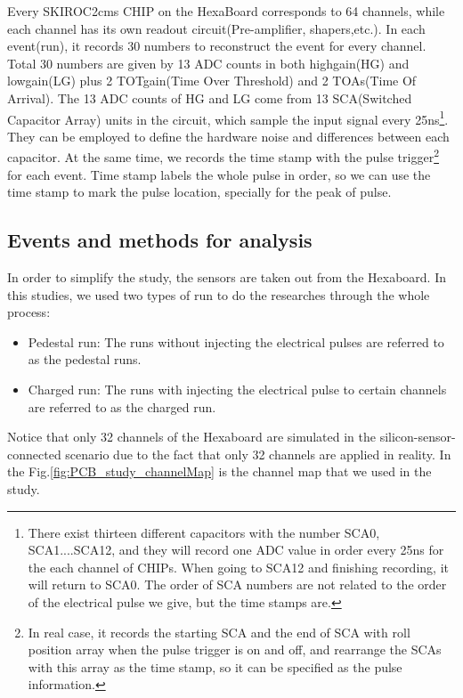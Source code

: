 \documentclass[12pt,twoside,a4paper,an,final]{cms-tdr}
\begin{document}
Every SKIROC2cms CHIP on the HexaBoard corresponds to 64 channels, while each channel has its own readout circuit(Pre-amplifier, shapers,etc.). In each event(run), it records 30 numbers to reconstruct the event for every channel. Total 30 numbers are given by 13 ADC counts in both highgain(HG) and lowgain(LG) plus 2 TOTgain(Time Over Threshold) and 2 TOAs(Time Of Arrival).  The 13 ADC counts of HG and LG come from 13 SCA(Switched Capacitor Array) units in the circuit, which sample the input signal every 25ns\footnote{There exist thirteen different capacitors with the number SCA0, SCA1....SCA12, and they will record one ADC value in order every 25ns for the each channel of CHIPs. When going to SCA12 and finishing recording, it will return to SCA0. The order of SCA numbers are not related to the order of the electrical pulse we give, but the time stamps are.}. They can be employed to define the hardware noise and differences between each capacitor. At the same time, we records the time stamp with the pulse trigger\footnote{In real case, it records the starting SCA and the end of SCA with roll position array when the pulse trigger is on and off, and rearrange the SCAs with this array as the time stamp, so it can be specified as the pulse information.} for each event. Time stamp labels the whole pulse in order,  so we can use the time stamp to mark the pulse location, specially for the peak of pulse. 

\subsection{Events and methods for analysis}
In order to simplify the study, the sensors are taken out from the Hexaboard. In this studies, we used two types of run to do the researches through the whole process:
\begin{itemize}
\item Pedestal run: The runs without injecting the electrical pulses are referred to as the pedestal runs.
\item Charged run: The runs with injecting the electrical pulse to certain channels are referred to as the charged run. 
\end{itemize}

Notice that only 32 channels of the Hexaboard are simulated in the silicon-sensor-connected scenario due to the fact that only 32 channels are applied in reality. In the Fig.\ref{fig:PCB_study_channelMap} is the channel map that we used in the study.
\end{document}
